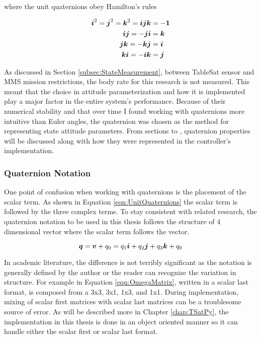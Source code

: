 where the unit quaternions obey Hamilton's rules \cite{wolfram_quaternion}

\begin{subequations}
  \begin{align}
    \boldsymbol{i}^2 = \boldsymbol{j}^2 = \boldsymbol{k}^2 = \boldsymbol{ijk} & = - \boldsymbol{1} \\
    \boldsymbol{i}\boldsymbol{j} = -\boldsymbol{j}\boldsymbol{i} &= \boldsymbol{k} \\
    \boldsymbol{j}\boldsymbol{k} = -\boldsymbol{k}\boldsymbol{j} &= \boldsymbol{i} \\
    \boldsymbol{k}\boldsymbol{i} = -\boldsymbol{i}\boldsymbol{k} &= \boldsymbol{j}
  \end{align}
  \label{eqn:HamiltonRules}
\end{subequations}

As discussed in Section \ref{subsec:StateMeasurement}, between TableSat sensor and MMS mission restrictions, the body rate for this research is not measured.  This meant that the choice in attitude parameterization and how it is implemented play a major factor in the entire system's performance.  Because of their numerical stability and that over time I found working with quaternions more intuitive than Euler angles, the quaternion was chosen as the method for representing state attitude parameters.  From sections  to , quaternion properties will be discussed along with how they were represented in the controller's implementation.

\subsubsection{Quaternion Notation}
\label{subsubsec:QuaternionNotation}

One point of confusion when working with quaternions is the placement of the scalar term.  As shown in Equation \ref{eqn:UnitQuaternions} the scalar term is followed by the three complex terms.  To stay consistent with related research, the quaternion notation to be used in this thesis follows the structure of 4 dimensional vector where the scalar term follows the vector.

\begin{equation}
  \boldsymbol{q} = \boldsymbol{v} + q_0 = q_1 \boldsymbol{i} + q_2 \boldsymbol{j} + q_3 \boldsymbol{k} + q_0
\end{equation}

In academic literature, the difference is not terribly significant as the notation is generally defined by the author or the reader can recognize the variation in structure.  For example in Equation \ref{eqn:OmegaMatrix}, written in a scalar last format, is composed from a 3x3, 3x1, 1x3, and 1x1.  During implementation, mixing of scalar first matrices with scalar last matrices can be a troublesome source of error.  As will be described more in Chapter \ref{chap:TSatPy}, the implementation in this thesis is done in an object oriented manner so it can handle either the scalar first or scalar last format.

